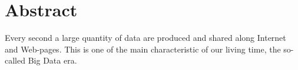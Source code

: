 \documentclass{standalone}
\begin{document}
\chapter*{Abstract}

Every second a large quantity of data are produced and shared along Internet and Web-pages.
This is one of the main characteristic of our living time, the so-called Big Data era.
\end{document}
